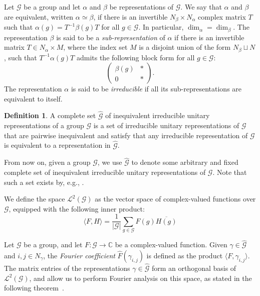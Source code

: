 \documentclass[a4paper,11pt]{article}
\theoremstyle{definition}
\newtheorem{definition}[theorem]{Definition}
\newcommand{\cc}{\mathbb{C}}
\newcommand{\gr}{\mathscr{G}}
\begin{document}
Let $\gr$ be a group and let $\alpha$ and $\beta$ be representations of $\gr$.
We say that $\alpha$ and $\beta$ are equivalent, written $\alpha \simeq \beta$, if
there is an invertible $N_\beta \times N_\alpha$ complex matrix $T$ such that
$\alpha(g)= T^{-1} \beta(g) T$ for all $g\in \gr$. In particular, $\dim_\alpha=\dim_\beta$.  The representation $\beta$ is said to be a \emph{sub-representation} of $\alpha$ if there is
an invertible matrix  $T\in N_\alpha\times M$, where the index set $M$ is a disjoint union of the form $N_\beta\sqcup N$, such that 
$T^{-1} \alpha(g) T$ admits the following block form for all $g\in \gr$:
\[
\begin{pmatrix}
\beta(g) & * \\
    0 & * 
\end{pmatrix}.
\]
The representation $\alpha$ is said to be \emph{irreducible} if all its sub-representations are equivalent to itself. \par

\begin{definition}
    A complete set $\widehat{\gr}$ of inequivalent irreducible unitary representations of a group $\gr$ is a set of irreducible unitary representations of $\gr$ that are pairwise inequivalent and satisfy that any irreducible representation of $\gr$ is equivalent to a representation in $\widehat{\gr}$.    
\end{definition}

From now on, given a group $\gr$, we use $\widehat{\gr}$ to denote some arbitrary and fixed complete set of inequivalent irreducible unitary representations of $\gr$. Note that such a set exists by, e.g., \cite[Proposition 1]{Terras_1999}.\par

We define the space $\mathcal{L}^2(\gr)$ as the vector space of complex-valued
functions over $\gr$, equipped with the following inner product:
\[
\langle F, H \rangle = 
\frac{1}{|\gr|} \sum_{g\in \gr}
F(g) \overline{H(g)}
\]



Let $\gr$ be a group, and let $F:\gr \rightarrow \cc$ be a complex-valued function. Given $\gamma\in \widehat{\gr}$ and $i,j\in N_\gamma$, the \emph{Fourier coefficient} $\widehat{F}(\gamma_{i,j})$ is defined as the product
$\langle F, \gamma_{i,j} \rangle$. 
The matrix entries of the representations $\gamma\in \widehat{\gr}$ form an orthogonal basis of $\mathcal{L}^2(\gr)$, and allow us to perform Fourier analysis on this space, as stated in the following theorem~\cite[Theorem 2]{Terras_1999}.
\end{document}
